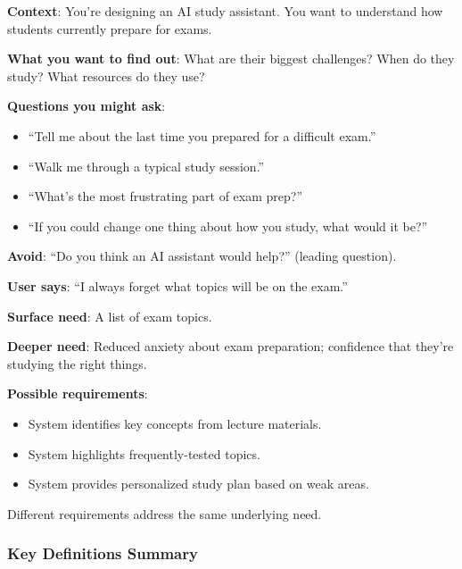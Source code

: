 \begin{exbox}
\textbf{Context}: You're designing an AI study assistant. You want to understand how students currently prepare for exams.

\textbf{What you want to find out}: What are their biggest challenges? When do they study? What resources do they use?

\textbf{Questions you might ask}:
\begin{itemize}
  \item ``Tell me about the last time you prepared for a difficult exam.''
  \item ``Walk me through a typical study session.''
  \item ``What's the most frustrating part of exam prep?''
  \item ``If you could change one thing about how you study, what would it be?''
\end{itemize}

\textbf{Avoid}: ``Do you think an AI assistant would help?'' (leading question).
\end{exbox}

\begin{exbox}
\textbf{User says}: ``I always forget what topics will be on the exam.''

\textbf{Surface need}: A list of exam topics.

\textbf{Deeper need}: Reduced anxiety about exam preparation; confidence that they're studying the right things.

\textbf{Possible requirements}:
\begin{itemize}
  \item System identifies key concepts from lecture materials.
  \item System highlights frequently-tested topics.
  \item System provides personalized study plan based on weak areas.
\end{itemize}

Different requirements address the same underlying need.
\end{exbox}

\subsubsection*{Key Definitions Summary}

